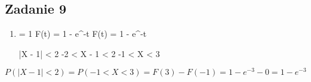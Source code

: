 \subsection{Zadanie 9}

\begin{enumerate}

\item
\lambda = 1
F(t) = 1 - e^{-\lambda *t}
F(t) = 1 - e^{-t}

|X - 1| < 2
-2 < X - 1 < 2
-1 < X < 3

\end{enumerate}
$$P(|X-1| < 2) = P(-1 < X < 3) = F(3) - F(-1) = 1-e^{-3} - 0 = 1 - e^{-3}$$

